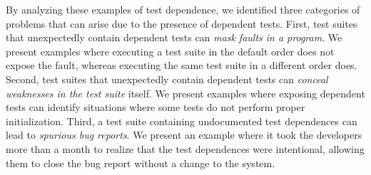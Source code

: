 By analyzing these examples of test dependence, we identified three
categories of problems that can arise due to the presence of dependent tests.
First, test suites that unexpectedly contain dependent tests can
\emph{mask faults in a program}.  We present examples where
executing a test suite in the default order does not expose the fault, whereas
executing the same test suite in a different order does.
Second, test suites that unexpectedly contain dependent tests can \emph{conceal
weaknesses in the test suite} itself.  We present examples where exposing
dependent tests can identify situations where some tests do not perform
proper initialization.
Third, a test suite containing undocumented test dependences can lead
to \emph{spurious bug reports}.  We present an example where it took the developers
more than a month to realize that the test dependences were intentional,
allowing them to close the bug report without a change to the system.



